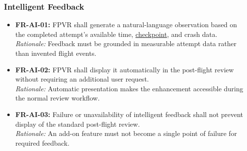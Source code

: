 \documentclass[12pt]{article}
\begin{document}
\subsubsection{Intelligent Feedback} 
\label{sec:s2-ai}
\begin{itemize}
\item \hypertarget{req:FR-AI-01}{}\textbf{FR-AI-01:} FPVR shall generate a natural-language observation based on the completed attempt's available time, \hyperlink{glos:Checkpoint}{checkpoint}, and crash data.\\
\textit{Rationale:} Feedback must be grounded in measurable attempt data rather than invented flight events.
\item \hypertarget{req:FR-AI-02}{}\textbf{FR-AI-02:} FPVR shall display it automatically in the post-flight review without requiring an additional user request.\\
\textit{Rationale:} Automatic presentation makes the enhancement accessible during the normal review workflow.
\item \hypertarget{req:FR-AI-03}{}\textbf{FR-AI-03:} Failure or unavailability of intelligent feedback shall not prevent display of the standard post-flight review.\\
\textit{Rationale:} An add-on feature must not become a single point of failure for required feedback.
\end{itemize}
\end{document}

